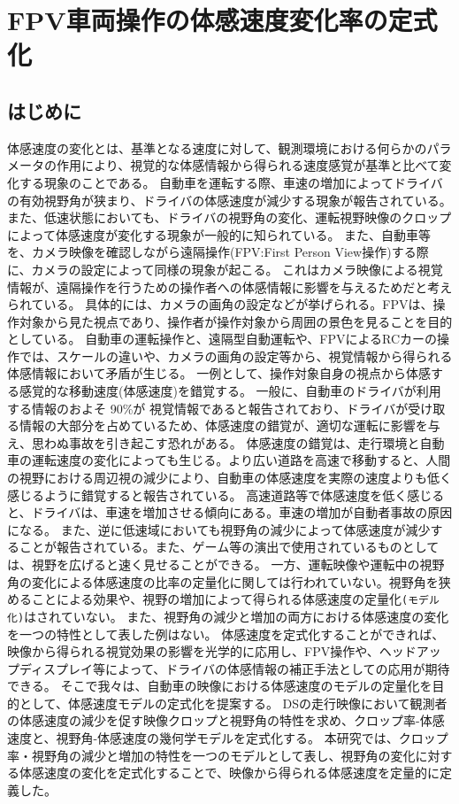\chapter{FPV車両操作の体感速度変化率の定式化}
\section{はじめに}
体感速度の変化とは、基準となる速度に対して、観測環境における何らかのパラメータの作用により、視覚的な体感情報から得られる速度感覚が基準と比べて変化する現象のことである。
自動車を運転する際、車速の増加によってドライバの有効視野角が狭まり、ドライバの体感速度が減少する現象が報告されている。
また、低速状態においても、ドライバの視野角の変化、運転視野映像のクロップによって体感速度が変化する現象が一般的に知られている。
また、自動車等を、カメラ映像を確認しながら遠隔操作(FPV:First Person View操作)する際に、カメラの設定によって同様の現象が起こる。
これはカメラ映像による視覚情報が、遠隔操作を行うための操作者への体感情報に影響を与えるためだと考えられている。
具体的には、カメラの画角の設定などが挙げられる。FPVは、操作対象から見た視点であり、操作者が操作対象から周囲の景色を見ることを目的としている。
自動車の運転操作と、遠隔型自動運転や、FPVによるRCカーの操作では、スケールの違いや、カメラの画角の設定等から、視覚情報から得られる体感情報において矛盾が生じる。
一例として、操作対象自身の視点から体感する感覚的な移動速度(体感速度)を錯覚する。
一般に、自動車のドライバが利用する情報のおよそ 90\%が 視覚情報であると報告されており、ドライバが受け取る情報の大部分を占めているため、体感速度の錯覚が、適切な運転に影響を与え、思わぬ事故を引き起こす恐れがある。
体感速度の錯覚は、走行環境と自動車の運転速度の変化によっても生じる。より広い道路を高速で移動すると、人間の視野における周辺視の減少により、自動車の体感速度を実際の速度よりも低く感じるように錯覚すると報告されている。
高速道路等で体感速度を低く感じると、ドライバは、車速を増加させる傾向にある。車速の増加が自動者事故の原因になる。
また、逆に低速域においても視野角の減少によって体感速度が減少することが報告されている。また、ゲーム等の演出で使用されているものとしては、視野を広げると速く見せることができる。
一方、運転映像や運転中の視野角の変化による体感速度の比率の定量化に関しては行われていない。視野角を狭めることによる効果や、視野の増加によって得られる体感速度の定量化\verb|(モデル化)|はされていない。
また、視野角の減少と増加の両方における体感速度の変化を一つの特性として表した例はない。
体感速度を定式化することができれば、映像から得られる視覚効果の影響を光学的に応用し、FPV操作や、ヘッドアップディスプレイ等によって、ドライバの体感情報の補正手法としての応用が期待できる。
そこで我々は、自動車の映像における体感速度のモデルの定量化を目的として、体感速度モデルの定式化を提案する。
DSの走行映像において観測者の体感速度の減少を促す映像クロップと視野角の特性を求め、クロップ率-体感速度と、視野角-体感速度の幾何学モデルを定式化する。
本研究では、クロップ率・視野角の減少と増加の特性を一つのモデルとして表し、視野角の変化に対する体感速度の変化を定式化することで、映像から得られる体感速度を定量的に定義した。

